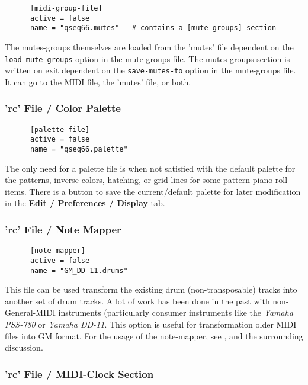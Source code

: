    \begin{verbatim}
      [midi-group-file]
      active = false
      name = "qseq66.mutes"   # contains a [mute-groups] section
   \end{verbatim}

   The mutes-groups themselves are loaded from the 'mutes' file dependent on
   the \texttt{load-mute-groups} option in the mute-groups file.
   The mutes-groups section is written on exit dependent on the
   \texttt{save-mutes-to} option in the mute-groups file.
   It can go to the MIDI file, the 'mutes' file, or both.

\subsubsection{'rc' File / Color Palette}
\label{subsubsec:configuration_rc_color_palette}

   \begin{verbatim}
      [palette-file]
      active = false
      name = "qseq66.palette"
   \end{verbatim}

   The only need for a palette file is when not satisfied with the
   default palette for the patterns, inverse colors, hatching,
   or grid-lines for some pattern piano roll items.
   There is a button to save the current/default
   palette for later modification in the \textbf{Edit / Preferences / Display}
   tab.

\subsubsection{'rc' File / Note Mapper}
\label{subsubsec:configuration_rc_note_mapper}

   \begin{verbatim}
      [note-mapper]
      active = false
      name = "GM_DD-11.drums"
   \end{verbatim}

   This file can be used transform the existing drum (non-transposable) tracks
   into another set of drum tracks.  A lot of work has been done in the past
   with non-General-MIDI instruments (particularly consumer instruments like the
   \textsl{Yamaha PSS-780} or \textsl{Yamaha DD-11}.
   This option is useful for transformation older MIDI files into GM format.
   For the usage of the note-mapper, see
   , and the surrounding
   discussion.

\subsubsection{'rc' File / MIDI-Clock Section}
\label{subsec:configuration_rc_midi_clock}

